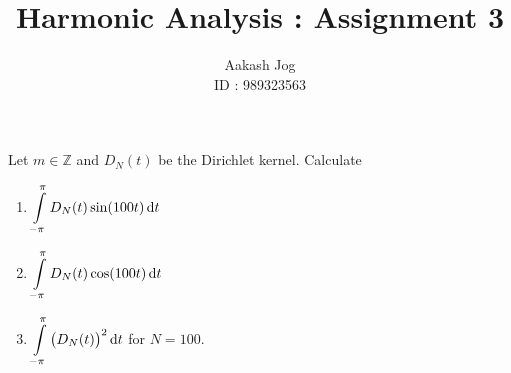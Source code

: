 \documentclass[fleqn, a4paper, 11pt, oneside]{amsart}
\title{Harmonic Analysis : Assignment 3}
\author
{
	Aakash Jog\\
	ID : 989323563
}
\date{\formatdate{17}{11}{2015}}
\theoremstyle{definition}
\theoremstyle{theorem}
\begin{document}

\maketitle

\begin{question}
	Let $m \in \mathbb{Z}$ and $D_N(t)$ be the Dirichlet kernel.
	Calculate
	\begin{enumerate}
		\item $\displaystyle \int\limits_{-\pi}^{\pi} D_N(t) \sin(100 t) \dif t$
		\item $\displaystyle \int\limits_{-\pi}^{\pi} D_N(t) \cos(100 t) \dif t$
		\item $\displaystyle \int\limits_{-\pi}^{\pi} \left( D_N(t) \right)^2 \dif t$ for $N = 100$.
	\end{enumerate}
\end{question}
\end{document}

